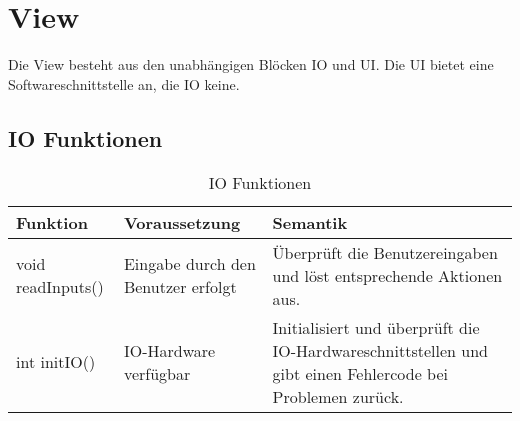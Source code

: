 

\clearpage
\section{View}
Die View besteht aus den unabhängigen Blöcken IO und UI. Die UI bietet eine Softwareschnittstelle an, die IO keine.

\subsection{IO Funktionen}
\begin{table}[h!]
    \centering
    \begin{tabular}{|p{5cm}|p{5cm}|p{5cm}|}
        \hline
        \textbf{Funktion} & \textbf{Voraussetzung} & \textbf{Semantik} \\
        \hline
        void readInputs() & Eingabe durch den Benutzer erfolgt & Überprüft die Benutzereingaben und löst entsprechende Aktionen aus. \\
        \hline
        int initIO() & IO-Hardware verfügbar & Initialisiert und überprüft die IO-Hardwareschnittstellen und gibt einen Fehlercode bei Problemen zurück. \\
        \hline
    \end{tabular}
    \caption{IO Funktionen}
    \label{tab:IOFunktionen}
\end{table}
